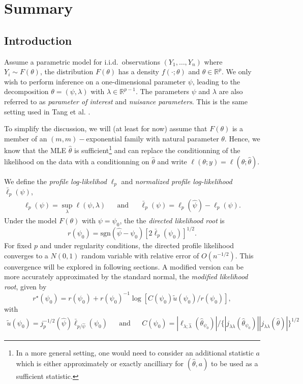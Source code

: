 \section{Summary}

\subsection{Introduction}

Assume a parametric model for i.i.d.\ observations $(Y_1, \ldots, Y_n)$ where $Y_i \sim F(\theta)$, the distribution $F(\theta)$ has a density $f(\cdot; \theta)$ and $\theta \in \mathbb{R}^p$. We only wish to perform inference on a one-dimensional parameter $\psi$, leading to the decomposition $\theta = (\psi, \lambda)$ with $\lambda \in \mathbb{R}^{p-1}$. The parameters $\psi$ and $\lambda$ are also referred to as \textit{parameter of interest} and \textit{nuisance parameters}. This is the same setting used in Tang et al. \cite{Tang2020}.

To simplify the discussion, we will (at least for now) assume that $F(\theta)$ is a member of an $(m,m)-$exponential family with natural parameter $\theta$. Hence, we know that the MLE $\hat\theta$ is sufficient\footnote{In a more general setting, one would need to consider an additional statistic $a$ which is either approximately or exactly ancilliary for $(\hat\theta, a)$ to be used as a sufficient statistic.} and can replace the conditionning of the likelihood on the data with a conditionning on $\hat\theta$ and write $\ell(\theta; y) = \ell(\theta; \hat\theta)$. 

We define the \textit{profile log-likelihod} $\ell_p$ and \textit{normalized profile log-likelihood} $\bar\ell_p(\psi)$,
\begin{align*}
    \ell_p(\psi) = \sup_{\lambda} \ell(\psi, \lambda) && \text{and} && \bar\ell_p(\psi) = \ell_p(\hat\psi) - \ell_p(\psi).
\end{align*}
Under the model $F(\theta)$ with $\psi = \psi_0$, the the \textit{directed likelihood root} is 
\begin{equation*}
    r(\psi_0) = \text{sgn}(\hat\psi - \psi_0)\left[2 \bar\ell_p(\psi_0)\right]^{1/2}.
\end{equation*}
For fixed $p$ and under regularity conditions, the directed profile likelihood converges to a $N(0, 1)$ random variable with relative error of $O(n^{-1/2})$. This convergence will be explored in following sections. A modified version can be more accurately approximated by the standard normal, the \textit{modified likelihood root}, given by
\begin{equation}
    r^\star(\psi_0) = r(\psi_0) + r(\psi_0)^{-1}\log\left[C(\psi_0)\tilde u(\psi_0) / r(\psi_0)\right],
\end{equation}
with
\begin{align*}
    \tilde u(\psi_0) = j_p^{-1/2}(\hat\psi)\bar\ell_{p/\hat\psi}(\psi_0) && \text{and} && C(\psi_0) = |\ell_{\lambda; \hat\lambda}(\hat\theta_{\psi_0})| / \{ |j_{\lambda\lambda}(\hat\theta_{\psi_0})||j_{\lambda\lambda}(\hat\theta)| \}^{1/2}
\end{align*}

